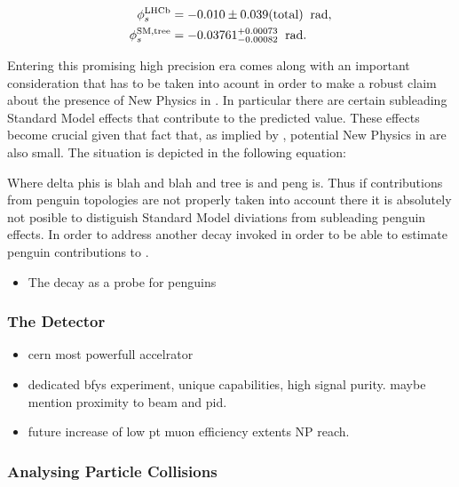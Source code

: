 \begin{subequations}
  \label{app_phis_lhcb_theo}
  \begin{align}
  \centering
  \phiS{\lhcb}           &=  -0.010 \pm 0.039(\text{total})  \;\; \text{rad},
  \label{app_phis_lhcb}\\
  \phiS{SM,tree}  &= -0.03761 {}^{+0.00073}_{-0.00082}  \;\; \text{rad}.
  \label{app_phis_theo}
\end{align}
\end{subequations}


Entering this promising high precision era comes along with an important consideration that
has to be taken into acount in order to make a robust claim about the presence of New Physics
in \phis. In particular there are certain subleading Standard Model effects that contribute to
the predicted \phis value. These effects become crucial given that fact that, as implied by ,
potential New Physics in \phis are also small. The situation is depicted in the following equation:

\noindent Where delta phis is blah and blah and tree is and peng is.
Thus if contributions from penguin topologies are not properly taken into account there it is
absolutely not posible to distiguish Standard Model diviations from subleading penguin effects.
In order to address another decay invoked in order to be able to estimate penguin contributions
to \phis.

\begin{itemize}
  \item The \BsJpsiKst decay as a probe for penguins
\end{itemize}

\subsubsection{The \lhcb Detector}

\begin{itemize}
\item \lhc cern most powerfull accelrator
\item \lhcb dedicated bfys experiment, unique capabilities, high signal purity. maybe mention proximity to beam and pid.
\item future increase of low pt muon efficiency extents NP reach.
\end{itemize}

\subsubsection{Analysing Particle Collisions}

